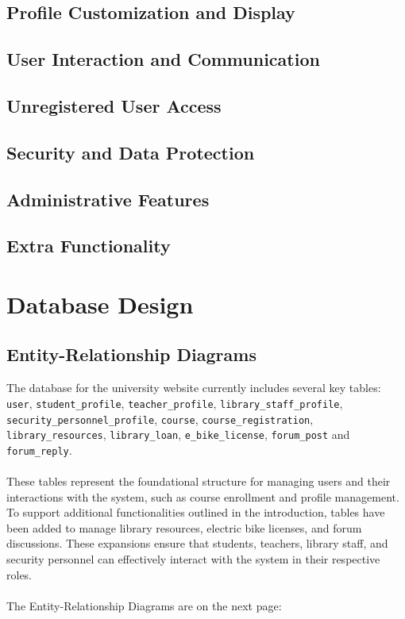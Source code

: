 \documentclass[12pt]{article}
\begin{document}
\subsection{Profile Customization and Display}
\subsection{User Interaction and Communication}
\subsection{Unregistered User Access}
\subsection{Security and Data Protection}
\subsection{Administrative Features}
\subsection{Extra Functionality}

\newpage
\section{Database Design}

\subsection{Entity-Relationship Diagrams}
The database for the university website currently includes several key tables: \texttt{user}, 
\texttt{student\_profile}, \texttt{teacher\_profile}, \texttt{library\_staff\_profile}, 
\texttt{security\_personnel\_profile}, \texttt{course}, \texttt{course\_registration}, \texttt{library\_resources}, 
\texttt{library\_loan}, \texttt{e\_bike\_license}, \texttt{forum\_post} and \texttt{forum\_reply}.\\ \\ 
These tables represent the foundational structure for managing users and their interactions with the system, 
such as course enrollment and profile management. To support additional functionalities outlined in the introduction, 
tables have been added to manage library resources, electric bike licenses, and forum discussions. 
These expansions ensure that students, teachers, library staff, and security personnel can effectively interact 
with the system in their respective roles. \\ \\ 
The Entity-Relationship Diagrams are on the next page:
\end{document}
